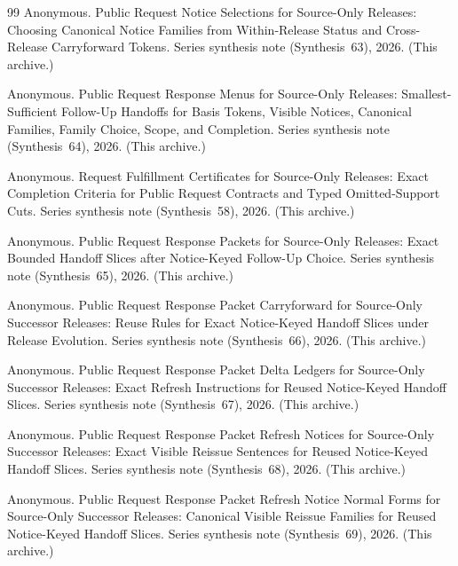 \documentclass[11pt]{article}
\begin{document}
\begin{thebibliography}{99}
Anonymous.
\newblock Public Request Notice Selections for Source-Only Releases: Choosing Canonical Notice Families from Within-Release Status and Cross-Release Carryforward Tokens.
\newblock Series synthesis note (Synthesis~63), 2026. (This archive.)

Anonymous.
\newblock Public Request Response Menus for Source-Only Releases: Smallest-Sufficient Follow-Up Handoffs for Basis Tokens, Visible Notices, Canonical Families, Family Choice, Scope, and Completion.
\newblock Series synthesis note (Synthesis~64), 2026. (This archive.)

Anonymous.
\newblock Request Fulfillment Certificates for Source-Only Releases: Exact Completion Criteria for Public Request Contracts and Typed Omitted-Support Cuts.
\newblock Series synthesis note (Synthesis~58), 2026. (This archive.)



Anonymous.
\newblock Public Request Response Packets for Source-Only Releases: Exact Bounded Handoff Slices after Notice-Keyed Follow-Up Choice.
\newblock Series synthesis note (Synthesis~65), 2026. (This archive.)

Anonymous.
\newblock Public Request Response Packet Carryforward for Source-Only Successor Releases: Reuse Rules for Exact Notice-Keyed Handoff Slices under Release Evolution.
\newblock Series synthesis note (Synthesis~66), 2026. (This archive.)

Anonymous.
\newblock Public Request Response Packet Delta Ledgers for Source-Only Successor Releases: Exact Refresh Instructions for Reused Notice-Keyed Handoff Slices.
\newblock Series synthesis note (Synthesis~67), 2026. (This archive.)

Anonymous.
\newblock Public Request Response Packet Refresh Notices for Source-Only Successor Releases: Exact Visible Reissue Sentences for Reused Notice-Keyed Handoff Slices.
\newblock Series synthesis note (Synthesis~68), 2026. (This archive.)

Anonymous.
\newblock Public Request Response Packet Refresh Notice Normal Forms for Source-Only Successor Releases: Canonical Visible Reissue Families for Reused Notice-Keyed Handoff Slices.
\newblock Series synthesis note (Synthesis~69), 2026. (This archive.)


\end{thebibliography}
\end{document}
